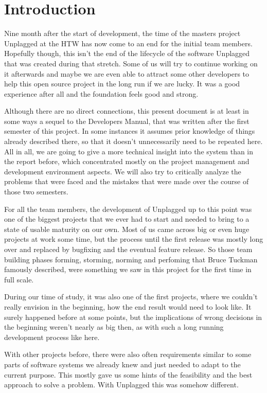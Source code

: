 \chapter*{Introduction}

Nine month after the start of development, the time of the masters project Unplagged at the HTW has now come to an end for the 
initial team members. Hopefully though, 
this isn't the end of the lifecycle of the software Unplagged that was created during that stretch. Some of us will try to continue working on it afterwards and maybe we are even able to attract some other developers to help this open source project in the long run if we are lucky. It was a good experience after all and the foundation feels good and strong.

Although there are no direct connections, this present document is at least in some ways a sequel to the Developers Manual, that was
written after the first semester of this project. In some instances it assumes prior knowledge of things already described there, so that it doesn't unnecessarily need to be repeated here.
All in all, we are going to give a more technical insight into the system than in the report before, which concentrated mostly
on the project management and development environment aspects. We will also try to critically 
analyze the problems that were faced and the mistakes that were made over the course of those
two semesters.

For all the team members, the development of Unplagged up to this point was one of 
the biggest 
projects that we ever had to start and needed to bring to a state of usable 
maturity on our own. Most of us came across big or even huge projects at work some time, but the process until 
the first release was mostly long over and replaced by bugfixing and the eventual feature release.
So those team building phases forming, storming, norming and perfoming that Bruce Tuckman famously described\citep{tuckman1965},
were something we saw in this project for the first time in full scale.

During our time of study, it was also one of the first projects, 
where we couldn't really envision in the beginning, how the end result would need to look like. It surely happened before at some points, but the implications of wrong decisions in the beginning weren't nearly as big then, as with such a long running development process like here.

With other projects before, there were also often requirements similar to some
parts of software systems we already knew and just needed to adapt to the current purpose.
This mostly gave us some hints of the feasibility and the best approach to solve a problem.
With Unplagged this was somehow different.


